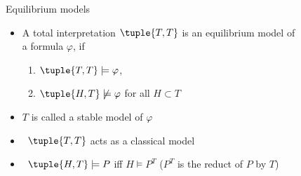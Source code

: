 \begin{frame}{Equilibrium models}
  \begin{itemize}
  \item A total interpretation $\tuple{ T,T}$ is an \alert{equilibrium model}
    of\\ a formula $\varphi$,
    if
    \par
    \smallskip
    \begin{enumerate}\normalsize
    \item
      \(
      \tuple{ T,T}\models\varphi
      \),
    \item
      \(
      \tuple{H,T}\not\models\varphi
      \)
      for all $H\subset T$
    \end{enumerate}
    \smallskip
  \item <2-> $T$ is called a \alert{stable model} of $\varphi$
    \bigskip
  \item<3->  \ $\tuple{T,T}$ acts as a classical model
    \smallskip
  \item<4->  \ $\tuple{H,T} \models P$ iff $H \models P^T$ \hfill ($P^T$ is the reduct of $P$ by $T$)
  \end{itemize}
\end{frame}
%
